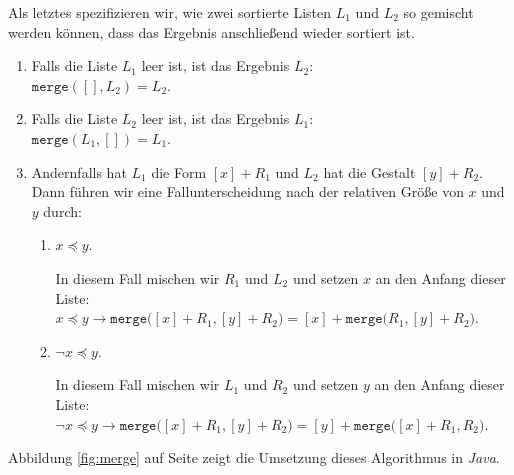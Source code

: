 Als letztes spezifizieren wir, wie zwei sortierte Listen $L_1$ 
und $L_2$ so gemischt werden k\"onnen, dass das Ergebnis anschlie\ss{}end wieder sortiert ist.
\begin{enumerate}
\item Falls die Liste $L_1$ leer ist, ist das Ergebnis $L_2$: \\[0.1cm]
      \hspace*{1.3cm} 
      $\mathtt{merge}([], L_2) = L_2$.
\item Falls die Liste $L_2$ leer ist, ist das Ergebnis $L_1$: \\[0.1cm]
      \hspace*{1.3cm} 
      $\mathtt{merge}(L_1, []) = L_1$.
\item Andernfalls hat $L_1$ die Form $[x] + R_1$ und $L_2$ hat die Gestalt $[y] + R_2$.
      Dann f\"uhren wir eine Fallunterscheidung nach der relativen Gr\"o\ss{}e von $x$ und $y$ durch:
      \begin{enumerate}
      \item $x \preceq y$.

            In diesem Fall mischen wir $R_1$ und $L_2$ und setzen $x$ an den Anfang dieser Liste:\\[0.1cm]
            \hspace*{1.3cm} 
            $x \preceq y \rightarrow \mathtt{merge}\bigl([x]+R_1, [y]+R_2\bigr) = [x] + \mathtt{merge}\bigl(R_1,[y]+R_2\bigr)$.
      \item $\neg x \preceq y$.

            In diesem Fall mischen wir $L_1$ und $R_2$ und setzen $y$ an den Anfang dieser Liste:\\[0.1cm]
            \hspace*{1.3cm} 
            $\neg x \preceq y \rightarrow \mathtt{merge}\bigl([x]+R_1, [y]+R_2\bigr) = [y] + \mathtt{merge}\bigl([x] + R_1,R_2\bigr)$.
      \end{enumerate}
\end{enumerate}
Abbildung \ref{fig:merge} auf Seite \pageref{fig:merge} 
zeigt die Umsetzung dieses Algorithmus in \textsl{Java}.

